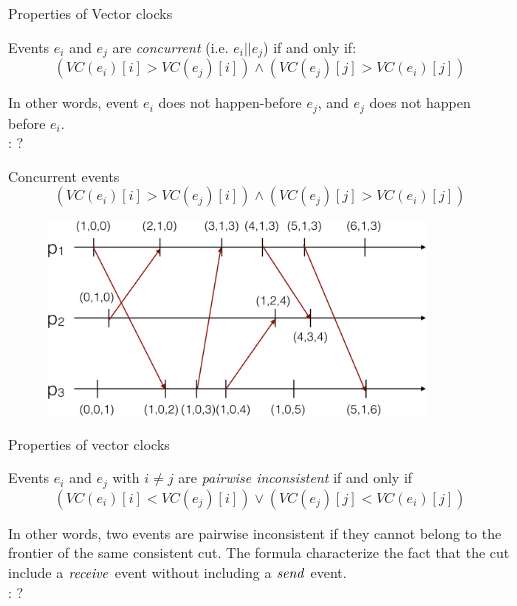 \begin{frame}{Properties of Vector clocks}
	
\begin{definition}
Events $e_i$ and $e_j$ are {\em concurrent} (i.e. $e_i || e_j$) if and only if:
\[
   (VC(e_i)[i] > VC(e_j)[i]) \wedge (VC(e_j)[j] > VC(e_i)[j])
\]
\end{definition}

\bigskip
In other words, event $e_i$ does not happen-before $e_j$, and $e_j$ does not happen before
$e_i$.\\

\bigskip
{}: ?

\end{frame}

\begin{frame}{Concurrent events}
\[
   (VC(e_i)[i] > VC(e_j)[i]) \wedge (VC(e_j)[j] > VC(e_i)[j])
\]

\begin{figure} 
\includegraphics[width=10cm]{figs/03/diagram5}
\end{figure}


\end{frame}

\begin{frame}{Properties of vector clocks}
	
\begin{definition}
Events $e_i$ and $e_j$ with $i \neq j$ are {\em pairwise inconsistent} if and only if
\[
   (VC(e_i)[i] < VC(e_j)[i]) \vee (VC(e_j)[j] < VC(e_i)[j])
\]
\end{definition}

\bigskip
In other words,  two events are pairwise inconsistent if they cannot belong to the frontier
of the same consistent cut. The formula characterize the fact that the cut include
a $\mathit{receive}$ event without including a $\mathit{send}$ event.\\

\bigskip
{}: ?



\end{frame}


